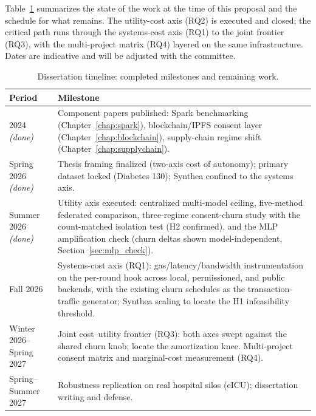 \documentclass[12pt]{report}
\begin{document}
Table~\ref{tab:timeline} summarizes the state of the work at the time of this
proposal and the schedule for what remains. The utility-cost axis (RQ2) is
executed and closed; the critical path runs through the systems-cost axis (RQ1)
to the joint frontier (RQ3), with the multi-project matrix (RQ4) layered on the
same infrastructure. Dates are indicative and will be adjusted with the
committee.

\begin{table}[htbp]
\centering
\caption{Dissertation timeline: completed milestones and remaining work.}
\label{tab:timeline}
\begin{tabular}{p{3.2cm}p{9.6cm}}
\toprule
\textbf{Period} & \textbf{Milestone} \\
\midrule
2024 \emph{(done)} & Component papers published: Spark benchmarking
  (Chapter~\ref{chap:spark}), blockchain/IPFS consent layer
  (Chapter~\ref{chap:blockchain}), supply-chain regime shift
  (Chapter~\ref{chap:supplychain}). \\
Spring 2026 \emph{(done)} & Thesis framing finalized (two-axis cost of
  autonomy); primary dataset locked (Diabetes 130); Synthea confined to the
  systems axis. \\
Summer 2026 \emph{(done)} & Utility axis executed: centralized multi-model
  ceiling, five-method federated comparison, three-regime consent-churn study
  with the count-matched isolation test (H2 confirmed), and the MLP
  amplification check (churn deltas shown model-independent,
  Section~\ref{sec:mlp_check}). \\
\midrule
Fall 2026 & Systems-cost axis (RQ1): gas/latency/bandwidth instrumentation on
  the per-round hook across local, permissioned, and public backends, with the
  existing churn schedules as the transaction-traffic generator; Synthea
  scaling to locate the H1 infeasibility threshold. \\
Winter 2026--Spring 2027 & Joint cost--utility frontier (RQ3): both axes swept
  against the shared churn knob; locate the amortization knee. Multi-project
  consent matrix and marginal-cost measurement (RQ4). \\
Spring--Summer 2027 & Robustness replication on real hospital silos (eICU);
  dissertation writing and defense. \\
\bottomrule
\end{tabular}
\end{table}
\end{document}
